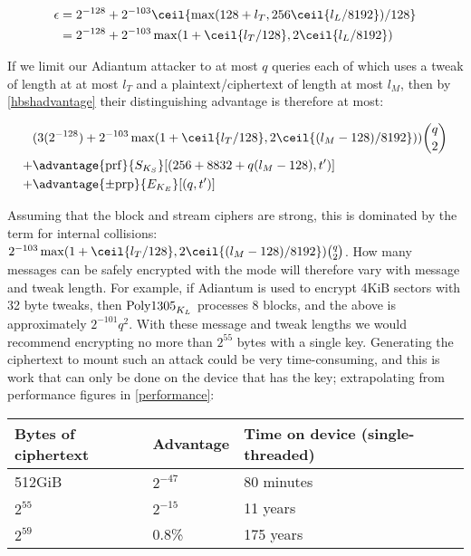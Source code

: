 \documentclass[eprint.tex]{subfiles}
\begin{document}
\begin{align*}
\epsilon &= 2^{-128} + 2^{-103}\ceil{\max(128 + l_T, 256\ceil{l_L/8192})/128}  \\
&= 2^{-128} + 2^{-103}\max(1 + \ceil{l_T/128}, 2\ceil{l_L/8192})
\end{align*}\label{adiantumepsilon}

If we limit our Adiantum attacker to at most $q$ queries each of which uses a tweak of length at
at most $l_T$ and a plaintext/ciphertext of length at most $l_M$, then by \autoref{hbshadvantage}
their distinguishing advantage is therefore at most:

\begin{align*}
{}&( 3(2^{-128}) + 2^{-103}\max(1 + \ceil{l_T/128}, 2\ceil{(l_M - 128)/8192}))\binom{q}{2} \\
+{}& \advantage{\mathrm{prf}}{S_{K_S}}[(256 + 8832 + q(l_M - 128), t')] \\
+{}& \advantage{\pm \mathrm{prp}}{E_{K_E}}[(q, t')] \\
\end{align*}

Assuming that the block and stream ciphers are strong, this is dominated by the
term for internal collisions: $2^{-103}\max(1 + \ceil{l_T/128}, 2\ceil{(l_M -
128)/8192})\binom{q}{2}$. How many messages can be safely encrypted with the
mode will therefore vary with message and tweak length. For example, if Adiantum
is used to encrypt 4KiB sectors with 32 byte tweaks, then $\operatorname{Poly1305}_{K_L}$
processes 8 blocks, and the above is approximately $2^{-101}q^2$. With these
message and tweak lengths we would recommend encrypting no more than $2^{55}$
bytes with a single key. Generating the ciphertext to mount such an attack could
be very time-consuming, and this is work that can only be done on the device
that has the key; extrapolating from performance figures in
\autoref{performance}:

\vspace{0.3cm}
\begin{tabular}{llll}
    Bytes of ciphertext & Advantage & Time on device (single-threaded) \\
    \hline
    512GiB & $2^{-47}$ & 80 minutes  \\
    $2^{55}$ & $2^{-15}$ & 11 years \\
    $2^{59}$ & 0.8\% & 175 years &
\end{tabular}
\vspace{0.3cm}

\subbib
\end{document}
